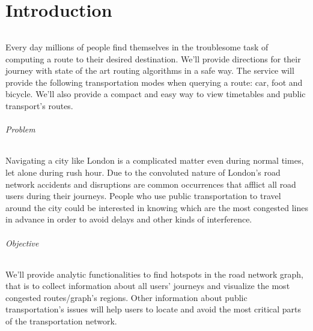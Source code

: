 \part{Introduction}

\paragraph{}
Every day millions of people find themselves in the troublesome task of 
computing a route to their desired destination. We'll provide directions for 
their journey with state of the art routing algorithms in a safe way. The 
service will provide the following transportation modes when querying a route: 
car, foot and bicycle. We’ll also provide a compact and easy way to view 
timetables and public transport’s routes.

\paragraph{Problem}
Navigating a city like London is a complicated matter even during normal times, 
let alone during rush hour. Due to the convoluted nature of London’s road 
network accidents and disruptions are common occurrences that afflict all road 
users during their journeys. People who use public transportation to travel 
around the city could be interested in knowing which are the most congested 
lines in advance in order to avoid delays and other kinds of interference.

\paragraph{Objective}
We’ll provide analytic functionalities to find hotspots in the road network 
graph, that is to collect information about all users’ journeys and visualize 
the most congested routes/graph’s regions. Other information about public 
transportation’s issues will help users to locate and avoid the most critical 
parts of the transportation network.
